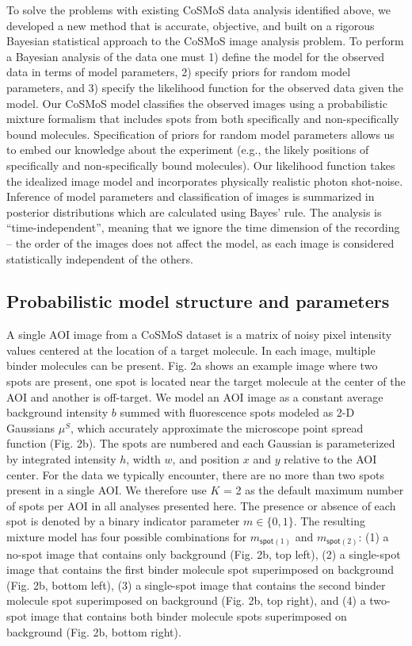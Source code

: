 To solve the problems with existing CoSMoS data analysis identified above, we developed a new method that is accurate, objective, and built on a rigorous Bayesian statistical approach to the CoSMoS image analysis problem. To perform a Bayesian analysis of the data one must 1) define the model for the observed data in terms of model parameters, 2) specify priors for random model parameters, and 3) specify the likelihood function for the observed data given the model. Our CoSMoS model classifies the observed images using a probabilistic mixture formalism that includes spots from both specifically and non-specifically bound molecules. Specification of priors for random model parameters allows us to embed our knowledge about the experiment (e.g., the likely positions of specifically and non-specifically bound molecules). Our likelihood function takes the idealized image model and incorporates physically realistic photon shot-noise. Inference of model parameters and classification of images is summarized in posterior distributions which are calculated using Bayes' rule. The analysis is “time-independent”, meaning that we ignore the time dimension of the recording -- the order of the images does not affect the model, as each image is considered statistically independent of the others. 

\subsection*{Probabilistic model structure and parameters} %

A single AOI image from a CoSMoS dataset is a matrix of noisy pixel intensity values centered at the location of a target molecule. In each image, multiple binder molecules can be present. Fig. 2a shows an example image where two spots are present, one spot is located near the target molecule at the center of the AOI and another is off-target. We model an AOI image as a constant average background intensity $b$ summed with fluorescence spots modeled as 2-D Gaussians $\mu^S$, which accurately approximate the microscope point spread function \cite{Zhang2007-rb} (Fig. 2b). The spots are numbered and each Gaussian is parameterized by integrated intensity $h$, width $w$, and position $x$ and $y$ relative to the AOI center. For the data we typically encounter, there are no more than two spots present in a single AOI. We therefore use $K$ = 2 as the default maximum  number of spots per AOI in all analyses presented here. The presence or absence of each spot is denoted by a binary indicator parameter $m \in \{0, 1\}$. The resulting mixture model has four possible combinations for $m_{\mathsf{spot}(1)}$ and $m_{\mathsf{spot}(2)}$: (1) a no-spot image that contains only background (Fig. 2b, top left), (2) a single-spot image that contains the first binder molecule spot superimposed on background (Fig. 2b, bottom left), (3) a single-spot image that contains the second binder molecule spot superimposed on background (Fig. 2b, top right), and (4) a two-spot image that contains both binder molecule spots superimposed on background (Fig. 2b, bottom right).

